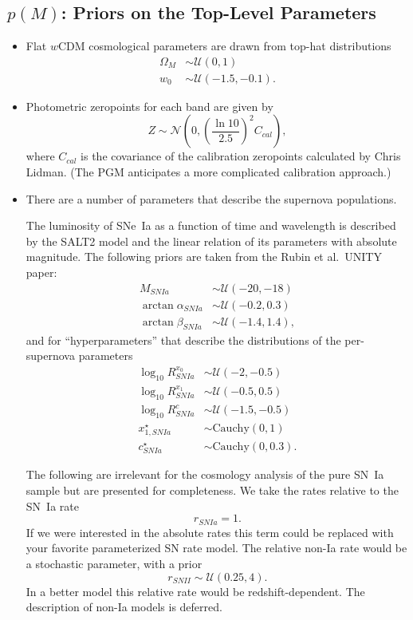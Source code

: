 \documentclass[preprint,3p]{elsarticle}
\begin{document}
\subsection{$p(M)$: Priors on the Top-Level Parameters}
\begin{itemize}
\item
Flat $w$CDM cosmological parameters are drawn from top-hat distributions
\begin{align}
\Omega_M & \sim  {\mathcal{U}}(0,1)\\
w_0 & \sim \mathcal{U}(-1.5, -0.1).
\end{align}

\item
Photometric zeropoints for each band are given by
\begin{equation}
Z \sim \mathcal{N}\left(0,\left(\frac{\ln{10}}{2.5}\right)^2 C_{cal}\right),
\end{equation}
where $C_{cal}$ is the covariance of the calibration zeropoints calculated by Chris Lidman.
(The PGM anticipates a more complicated calibration approach.)

\item
There are a number of parameters that describe the supernova populations.

The luminosity of SNe~Ia as a function of time and wavelength is described by the SALT2 model and
the linear relation of its parameters with absolute magnitude.
The following priors are taken from the Rubin et al.\ UNITY paper:
\begin{align}
M_{SNIa} & \sim \mathcal{U}(-20, -18) \\
\arctan{\alpha_{SNIa}} & \sim \mathcal{U}(-0.2, 0.3) \\
\arctan{\beta_{SNIa}} & \sim \mathcal{U}(-1.4, 1.4),
\end{align}
and for ``hyperparameters'' that describe the distributions of the per-supernova parameters
\begin{align}
\log_{10}{R^{x_0}_{SNIa}} & \sim \mathcal{U}({-2}, {-0.5})\\
\log_{10}{R^{x_1}_{SNIa}} & \sim \mathcal{U}({-0.5}, {0.5})\\
\log_{10}{R^{c}_{SNIa}} & \sim \mathcal{U}({-1.5}, {-0.5})\\
x_{1,SNIa}^\star& \sim \text{Cauchy}(0,1)\\
c^\star_{SNIa} & \sim \text{Cauchy}(0,0.3).
\end{align}

The following are irrelevant for the cosmology analysis of the pure SN~Ia sample
but are presented for completeness.
We take the rates relative to the SN~Ia rate
\begin{equation}
r_{SNIa} = 1.
\end{equation}
If we were interested in the absolute rates this term could be replaced with your favorite parameterized
SN rate model.
The relative non-Ia rate would be a stochastic parameter, with a prior
\begin{equation}
r_{SNII} \sim \mathcal{U}(0.25, 4).
\end{equation}
In a better model this relative rate would be redshift-dependent.
The description of non-Ia models is deferred.


\end{itemize}
\end{document}
